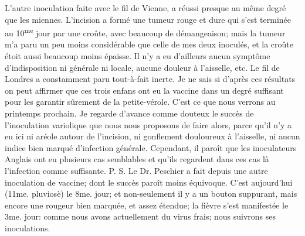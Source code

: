 L'autre inoculation faite avec le fil de Vienne, a réussi presque au même degré que les miennes. L'incision a formé une tumeur rouge et dure qui s'est terminée au 10\textsuperscript{me} jour par une croûte, avec beaucoup de démangeaison; mais la tumeur m'a paru un peu moins considérable que celle de mes deux inoculés, et la croûte étoit aussi beaucoup moins épaisse. Il n'y a eu d'ailleurs aucun symptôme d'indisposition ni générale ni locale, aucune douleur à l'aisselle, etc.
Le fil de Londres a constamment paru tout-à-fait inerte.
Je ne sais si d'après ces résultats on peut affirmer que ces trois enfans ont eu la vaccine dans un degré suffisant pour les garantir sûrement de la petite-vérole. C'est ce que nous verrons au printemps prochain. Je regarde d'avance comme douteux le succès de l'inoculation variolique que nous nous proposons de faire\setcounter{page}{116} alors, parce qu'il n'y a eu ici ni aréole autour de l'incision, ni gonflement douloureux à l'aisselle, ni aucun indice bien marqué d'infection générale. Cependant, il paroît que les inoculateurs Anglais ont eu plusieurs cas semblables et qu'ils regardent dans ces cas là l'infection comme suffisante.
P. S. Le Dr. Peschier a fait depuis une autre inoculation de vaccine; dont le succès paroît moins équivoque. C'est aujourd'hui (11me. pluviosè) le 8me. jour; et non-seulement il y a un bouton suppurant, mais encore une rougeur bien marquée, et assez étendue; la fièvre s'est manifestée le 3me. jour: comme nous avons actuellement du virus frais; nous suivrons ses inoculations.
